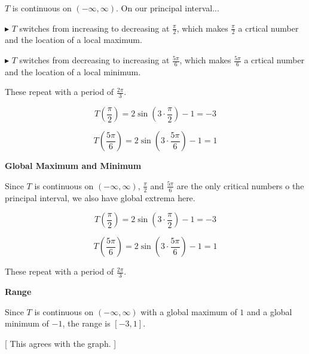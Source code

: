 \documentclass{ximera}
\begin{document}
$T$ is continuous on $(-\infty, \infty)$. On our principal interval...


$\blacktriangleright$ $T$ switches from increasing to decreasing at $\frac{\pi}{2}$, which makes $\frac{\pi}{2}$ a crtical number and the location of a local maximum. 




$\blacktriangleright$ $T$ switches from decreasing to increasing at $\frac{5\pi}{6}$, which makes $\frac{5\pi}{6}$ a crtical number and the location of a local minimum. 


These repeat with a period of $\frac{2\pi}{3}$. 



\[
T\left( \frac{\pi}{2} \right) = 2 \sin\left(3 \cdot \frac{\pi}{2} \right) - 1 = -3
\]




\[
T\left( \frac{5\pi}{6} \right) = 2 \sin\left(3 \cdot \frac{5\pi}{6} \right) - 1 = 1
\]












\textbf{\textcolor{blue!55!black}{Global Maximum and Minimum}}


Since $T$ is continuous on $(-\infty, \infty)$, $\frac{\pi}{2}$ and $\frac{5\pi}{6}$ are the only critical numbers o the principal interval, we also have global extrema here. 




\[
T\left( \frac{\pi}{2} \right) = 2 \sin\left(3 \cdot \frac{\pi}{2} \right) - 1 = -3
\]




\[
T\left( \frac{5\pi}{6} \right) = 2 \sin\left(3 \cdot \frac{5\pi}{6} \right) - 1 = 1
\]




These repeat with a period of $\frac{2\pi}{3}$. 









\textbf{\textcolor{blue!55!black}{Range}}


Since $T$ is continuous on $(-\infty, \infty)$ with a global maximum of $1$ and a global minimum of $-1$, the range is $[-3, 1]$.  



[ This agrees with the graph. ]
\end{document}
